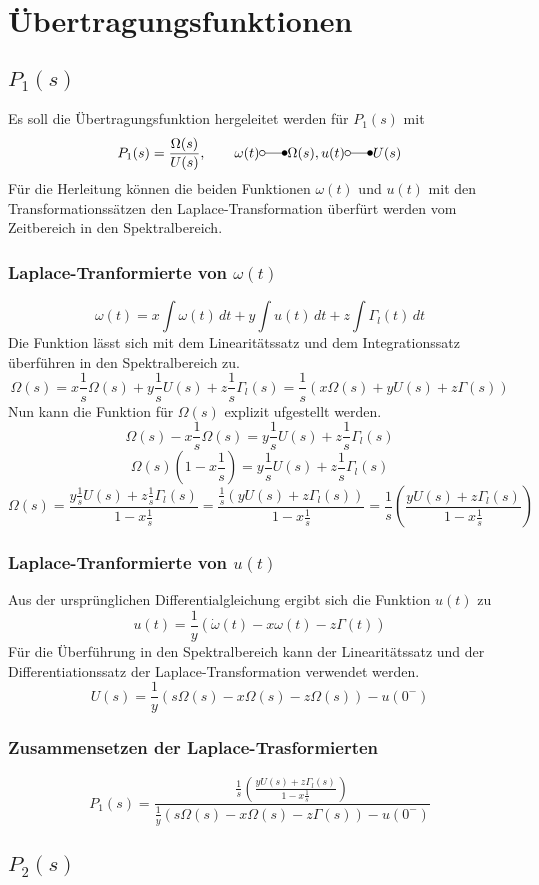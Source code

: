 \section{Übertragungsfunktionen}
\subsection{$P_1(s)$}
Es soll die Übertragungsfunktion hergeleitet werden für $P_1(s)$ mit
\[
	P_1(s) = \frac{\Omega(s)}{U(s)},
	\qquad
	\omega(t) \laplace \Omega(s),
	u(t) \laplace U(s)
\]
Für die Herleitung können die beiden Funktionen $\omega(t)$ und $u(t)$ mit
den Transformationssätzen den Laplace-Transformation überfürt werden vom
Zeitbereich in den Spektralbereich.
\subsubsection{Laplace-Tranformierte von $\omega(t)$}
\[
	\omega(t)
	= x \int\omega(t)\,dt
		+ y \int u(t)\,dt
		+ z \int \Gamma_l(t)\,dt
\]
Die Funktion lässt sich mit dem Linearitätssatz und dem Integrationssatz
überführen in den Spektralbereich zu.
\[
	\Omega(s)
	= x \frac{1}{s} \Omega(s)
		+ y \frac{1}{s} U(s)
		+ z \frac{1}{s} \Gamma_l(s)
	= \frac{1}{s} \left( x \Omega(s) + y U(s) + z \Gamma(s) \right)		
\]
Nun kann die Funktion für $\Omega(s)$ explizit ufgestellt werden.
\[
	\Omega(s) - x \frac{1}{s} \Omega(s)
	= y \frac{1}{s} U(s) + z \frac{1}{s} \Gamma_l(s)
\]
\[
	\Omega(s) \left( 1 - x \frac{1}{s} \right)
	= y \frac{1}{s} U(s) + z \frac{1}{s} \Gamma_l(s) 
\]
\[
	\Omega(s)
	= \frac{
			y \frac{1}{s} U(s) + z \frac{1}{s} \Gamma_l(s)
		}{
			1 - x \frac{1}{s}
		}
	= \frac{
			\frac{1}{s} \left( y U(s) + z \Gamma_l(s) \right)
		}{
			1 - x \frac{1}{s}
		}
	= \frac{1}{s} \left( \frac{
			y U(s) + z \Gamma_l(s)	
		}{
			1 - x \frac{1}{s}
		} \right)
\]

\subsubsection{Laplace-Tranformierte von $u(t)$}
Aus der ursprünglichen Differentialgleichung ergibt sich die Funktion
$u(t)$ zu
\[
	u(t)
	= \frac{1}{y} \left( \dot\omega(t)
		- x \omega(t)
		- z \Gamma(t) \right)
\]
Für die Überführung in den Spektralbereich kann der Linearitätssatz und der
Differentiationssatz der Laplace-Transformation verwendet werden.
\[
	U(s)
	= \frac{1}{y} \left( s \Omega(s)
		-  x \Omega(s)
		-  z \Omega(s) \right) - u(0^-)
\]

\subsubsection{Zusammensetzen der Laplace-Trasformierten}
\[
	P_1(s) =
		\frac{
			\frac{1}{s} \left(
				\frac{y U(s) + z \Gamma_l(s)}{1 - x \frac{1}{s}}
			\right)
		}{
			\frac{1}{y} \left(
				s \Omega(s)
				- x \Omega(s)
				- z \Gamma(s) 
			\right) - u(0^-)
		}
\]

\subsection{$P_2(s)$}
